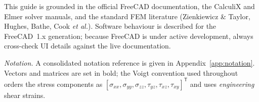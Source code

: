 This guide is grounded in the official FreeCAD documentation, the
CalculiX and Elmer solver manuals, and the standard FEM literature
(Zienkiewicz \& Taylor, Hughes, Bathe, Cook \emph{et al.}). Software
behaviour is described for the FreeCAD~1.x generation; because FreeCAD is
under active development, always cross-check UI details against the live
documentation.

\vspace{1em}
\noindent\textit{Notation.} A consolidated notation reference is given in
Appendix~\ref{app:notation}. Vectors and matrices are set in bold; the
Voigt convention used throughout orders the stress components as
$[\sigma_{xx},\sigma_{yy},\sigma_{zz},\tau_{yz},\tau_{xz},\tau_{xy}]^{\mathsf T}$
and uses \emph{engineering} shear strains.
